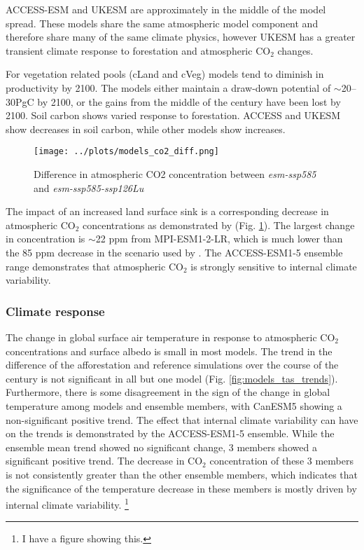 \documentclass[]{article}
\begin{document}
ACCESS-ESM and UKESM are approximately in the middle of the model spread.
These models share the same atmospheric model component and therefore share many of the same climate physics, however UKESM has a greater transient climate response to forestation and atmospheric CO$_2$ changes.

For vegetation related pools (cLand and cVeg) models tend to diminish in productivity by 2100.
The models  either maintain a draw-down potential of $\sim$20--30PgC by 2100, or the gains from the middle of the century have been lost by 2100.
Soil carbon shows varied response to forestation.
ACCESS and UKESM show decreases in soil carbon, while other models show increases.

\begin{figure}
    \centering
    \texttt{[image: ../plots/models\_co2\_diff.png]}
    \caption{Difference in atmospheric CO2 concentration between \textit{esm-ssp585} and \textit{esm-ssp585-ssp126Lu}}
    \label{fig:models_CO2}
\end{figure}

The impact of an increased land surface sink is a corresponding decrease in atmospheric CO$_2$ concentrations as demonstrated by (Fig. \ref{fig:models_CO2}).
The largest change in concentration is $\sim$22 ppm from MPI-ESM1-2-LR, which is much lower than the 85 ppm decrease in the scenario used by \cite{sonntag_reforestation_2016}.
The ACCESS-ESM1-5 ensemble range demonstrates that atmospheric CO$_2$ is strongly sensitive to internal climate variability.

\subsubsection{Climate response}

The change in global surface air temperature in response to atmospheric CO$_2$ concentrations and surface albedo is small in most models.
The trend in the difference of the afforestation and reference simulations over the course of the century is not significant in all but one model (Fig. \ref{fig:models_tas_trends}).
Furthermore, there is some disagreement in the sign of the change in global temperature among models and ensemble members, with CanESM5 showing a non-significant positive trend.
The effect that internal climate variability can have on the trends is demonstrated by the ACCESS-ESM1-5 ensemble.
While the ensemble mean trend showed no significant change, 3 members showed a significant positive trend.
The decrease in CO$_2$ concentration of these 3 members is not consistently greater than the other ensemble members, which indicates that the significance of the temperature decrease in these members is mostly driven by internal climate variability. \footnote{I have a figure showing this.}
\end{document}
